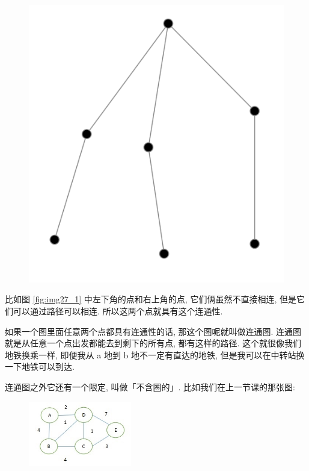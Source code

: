 \begin{figure}[ht]
\begin{minipage}[t]{0.3\textwidth}
    \includegraphics[width=\textwidth]{asset/20230924092635.png}
    \caption{}
    \label{fig:img27_2}
  \end{minipage}%
\end{figure}

比如图 \ref{fig:img27_1} 中左下角的点和右上角的点, 它们俩虽然不直接相连, 但是它们可以通过路径可以相连. 所以这两个点就具有这个连通性. 

如果一个图里面任意两个点都具有连通性的话, 那这个图呢就叫做连通图. 连通图就是从任意一个点出发都能去到剩下的所有点, 都有这样的路径. 这个就很像我们地铁换乘一样, 即便我从 a 地到 b 地不一定有直达的地铁, 但是我可以在中转站换一下地铁可以到达. 

连通图之外它还有一个限定, 叫做「不含圈的」. 比如我们在上一节课的那张图: 

\begin{figure}[ht]
  \centering
  \includegraphics[width=0.4\textwidth]{asset/20230924051221.jpg}
  \caption{}
  \label{fig:img27_3}
\end{figure}

